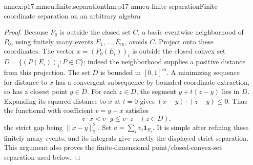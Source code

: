 \begin{annexitem}{annex:p17.mmeu.finite.separation}{thm:p17-mmeu-finite-separation}{Finite-coordinate separation on an arbitrary algebra}
\begin{proof}
Because \(P_0\) is outside the closed
set \(C\), a basic eventwise neighborhood
of \(P_0\), using finitely many events
\(E_1,\ldots,E_m\), avoids \(C\).
Project onto these coordinates.
The vector \(x=(P_0(E_i))_i\)
is outside the closed convex set
\(D=\overline{\{(P(E_i))_i:P\in C\}}\);
indeed the neighborhood supplies a
positive distance from this projection.
The set \(D\) is bounded in \([0,1]^m\).
A minimizing sequence for distance to
\(x\) has a convergent subsequence
by bounded-coordinate extraction, so
has a closest point \(y\in D\).
For each \(z\in D\), the segment
\(y+t(z-y)\) lies in \(D\).
Expanding its squared distance to
\(x\) at \(t=0\) gives
\((x-y)\cdot(z-y)\leq0\).
Thus the functional with coefficient
\(v=y-x\) satisfies
\[
               v\cdot x<v\cdot y\leq v\cdot z
                                      \quad(z\in D),
\]
the strict gap being \(\|x-y\|_2^2\).
Set \(a=\sum_i v_i\mathbf1_{E_i}\).
It is simple after refining these
finitely many events, and its
integrals give exactly the displayed
strict separation. This argument also
proves the finite-dimensional
point/closed-convex-set separation
used below.
\end{proof}
\end{annexitem}

